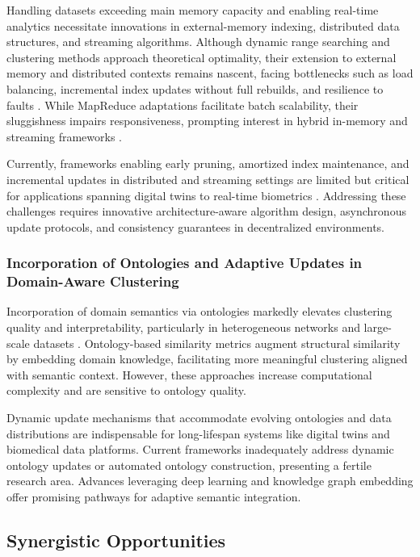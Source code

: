 \documentclass[sigconf]{acmart}
\begin{document}
Handling datasets exceeding main memory capacity and enabling real-time analytics necessitate innovations in external-memory indexing, distributed data structures, and streaming algorithms. Although dynamic range searching and clustering methods approach theoretical optimality, their extension to external memory and distributed contexts remains nascent, facing bottlenecks such as load balancing, incremental index updates without full rebuilds, and resilience to faults \cite{ref3,ref7}. While MapReduce adaptations facilitate batch scalability, their sluggishness impairs responsiveness, prompting interest in hybrid in-memory and streaming frameworks \cite{ref22}.

Currently, frameworks enabling early pruning, amortized index maintenance, and incremental updates in distributed and streaming settings are limited but critical for applications spanning digital twins to real-time biometrics \cite{ref26,ref29}. Addressing these challenges requires innovative architecture-aware algorithm design, asynchronous update protocols, and consistency guarantees in decentralized environments.

\subsubsection{Incorporation of Ontologies and Adaptive Updates in Domain-Aware Clustering}

Incorporation of domain semantics via ontologies markedly elevates clustering quality and interpretability, particularly in heterogeneous networks and large-scale datasets \cite{ref23}. Ontology-based similarity metrics augment structural similarity by embedding domain knowledge, facilitating more meaningful clustering aligned with semantic context. However, these approaches increase computational complexity and are sensitive to ontology quality.

Dynamic update mechanisms that accommodate evolving ontologies and data distributions are indispensable for long-lifespan systems like digital twins and biomedical data platforms. Current frameworks inadequately address dynamic ontology updates or automated ontology construction, presenting a fertile research area. Advances leveraging deep learning and knowledge graph embedding offer promising pathways for adaptive semantic integration.

\subsection{Synergistic Opportunities}
\end{document}
